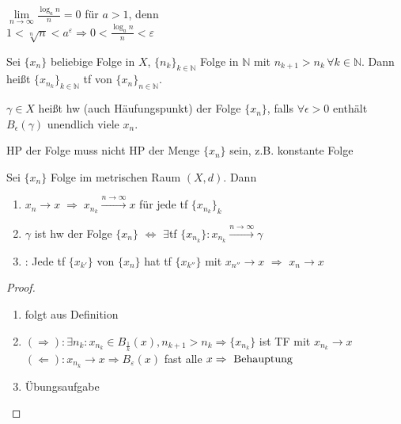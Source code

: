 \begin{example}
	$\lim\limits_{n\to\infty} \frac{\log_a n}{n}=0$ für $a>1$, denn \\
	$1<\sqrt[n]{n}< a^{\varepsilon}\Rightarrow 0 < \frac{\log_a n}{n} < \varepsilon$
\end{example}

\begin{definition}
	Sei $\{x_n\}$ beliebige Folge in $X$, $\{n_k\}_{k\in\mathbb{N}}$ Folge in $\mathbb{N}$ mit $n_{k+1} > n_k\,\forall k\in\mathbb{N}$. Dann heißt $\{x_{n_k}\}_{k\in\mathbb{N}}$ \gls{tf} von $\{x_n\}_{n\in\mathbb{N}}$.
	
	$\gamma\in X$ heißt \gls{hw} (auch Häufungspunkt) der Folge $\{x_n\}$, falls $\forall \epsilon > 0$ enthält $B_\epsilon(\gamma)$ unendlich viele $x_n$.
	\begin{underlinedenvironment}[beachte]
		HP der Folge muss nicht HP der Menge $\{x_n\}$ sein, z.B. konstante Folge
	\end{underlinedenvironment}
\end{definition}

\begin{proposition}\label{tfprinzip}
	Sei $\{x_n\}$ Folge im metrischen Raum $(X,d)$. Dann
	\begin{enumerate}[label={\arabic*)}]
		\item $x_n\rightarrow x \;\Rightarrow\; x_{n_k} \overset{n\rightarrow\infty}{\longrightarrow} x$ für jede \gls{tf} $\{x_{n_k}\}_k$
		\item $\gamma$ ist \gls{hw} der Folge $\{x_n\}$ $\Leftrightarrow$ $\exists$\gls{tf} $\{x_{n_k}\}: x_{n_k} \overset{n\rightarrow\infty}{\longrightarrow} \gamma$
		\item {}: Jede \gls{tf} $\{x_{k'}\}$ von $\{x_n\}$ hat \gls{tf} $\{x_{k''}\}$ mit $x_{n''}\rightarrow x$ $\Rightarrow$ $x_n \rightarrow x$
	\end{enumerate}
\end{proposition}
\begin{proof}
	\begin{enumerate}
		\item folgt aus Definition
		\item $(\Rightarrow):\exists n_k:x_{n_k}\in B_{\frac{1}{k}}(x), n_{k+1}>n_k\Rightarrow \{x_{n_k}\}$ ist TF mit $x_{n_k}\to x$ \\
		$(\Leftarrow):x_{n_k}\to x\Rightarrow B_{\varepsilon}(x)$ fast alle $x\Rightarrow \text{ Behauptung}$
		\item Übungsaufgabe
	\end{enumerate}
\end{proof}

